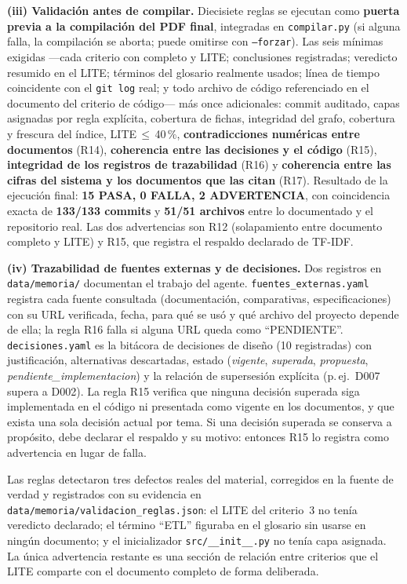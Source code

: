 \textbf{(iii) Validación antes de compilar.} Diecisiete reglas se ejecutan como
\textbf{puerta previa a la compilación del PDF final}, integradas en
\texttt{compilar.py} (si alguna falla, la compilación se aborta; puede omitirse
con \texttt{--forzar}). Las seis mínimas exigidas ---cada criterio con completo y
LITE; conclusiones registradas; veredicto resumido en el LITE; términos del
glosario realmente usados; línea de tiempo coincidente con el \texttt{git log}
real; y todo archivo de código referenciado en el documento del criterio de
código--- más once adicionales: commit auditado, capas asignadas por regla
explícita, cobertura de fichas, integridad del grafo, cobertura y frescura del
índice, LITE\,$\le$\,40\,\%, \textbf{contradicciones numéricas entre documentos}
(R14), \textbf{coherencia entre las decisiones y el código}
(R15), \textbf{integridad de los registros de trazabilidad} (R16) y
\textbf{coherencia entre las cifras del sistema y los documentos que las citan}
(R17). Resultado de
la ejecución final: \textbf{15 PASA, 0 FALLA, 2 ADVERTENCIA}, con coincidencia
exacta de \textbf{133/133 commits} y \textbf{51/51 archivos} entre lo documentado
y el repositorio real. Las dos advertencias son R12 (solapamiento entre documento
completo y LITE) y R15, que registra el respaldo declarado de TF-IDF.

\textbf{(iv) Trazabilidad de fuentes externas y de decisiones.} Dos registros en
\texttt{data/memoria/} documentan el trabajo del agente. \texttt{fuentes\_externas.yaml}
registra cada fuente consultada (documentación, comparativas, especificaciones)
con su URL verificada, fecha, para qué se usó y qué archivo del proyecto depende
de ella; la regla R16 falla si alguna URL queda como ``PENDIENTE''. \texttt{decisiones.yaml}
es la bitácora de decisiones de diseño (10 registradas) con justificación,
alternativas descartadas, estado (\emph{vigente}, \emph{superada},
\emph{propuesta}, \emph{pendiente\_implementacion}) y la relación de supersesión
explícita (p.\,ej.\ D007 supera a D002). La regla R15 verifica que ninguna
decisión superada siga implementada en el código ni presentada como vigente en
los documentos, y que exista una sola decisión actual por tema. Si una decisión
superada se conserva a propósito, debe declarar el respaldo y su motivo: entonces
R15 lo registra como advertencia en lugar de falla.

Las reglas detectaron tres defectos reales del material, corregidos en la fuente
de verdad y registrados con su evidencia en
\texttt{data/memoria/validacion\_reglas.json}: el LITE del criterio~3 no tenía
veredicto declarado; el término ``ETL'' figuraba en el glosario sin usarse en
ningún documento; y el inicializador \texttt{src/\_\_init\_\_.py} no tenía capa
asignada. La única advertencia restante es una sección de relación entre
criterios que el LITE comparte con el documento completo de forma deliberada.
